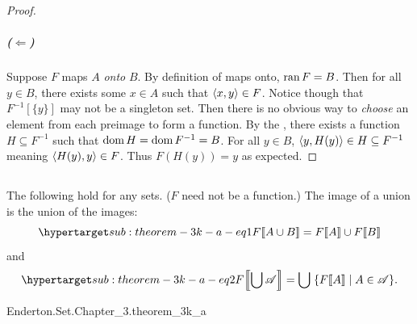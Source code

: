 \documentclass{report}
\begin{document}
\begin{proof}
      \subparagraph{($\Leftarrow$)}%

        Suppose $F$ maps $A$ \textit{onto} $B$.
        By definition of maps onto, $\mathop{\text{ran}}{F} = B$.
        Then for all $y \in B$, there exists some $x \in A$ such that
          $\left< x, y \right> \in F$.
        Notice though that $F^{-1}[\{y\}]$ may not be a singleton set.
        Then there is no obvious way to \textit{choose} an element from each
          preimage to form a function.
        By the , there exists a function
          $H \subseteq F^{-1}$ such that $\mathop{\text{dom}}{H} = \mathop{\text{dom}}{F^{-1}} = B$.
        For all $y \in B$, $\left< y, H(y) \right> \in H \subseteq F^{-1}$
          meaning $\left< H(y), y \right> \in F$.
        Thus $F(H(y)) = y$ as expected.

  \end{proof}

\subsection{}%

  \begin{theorem}[3K(a)]
    The following hold for any sets. ($F$ need not be a function.)
    The image of a union is the union of the images:
      \begin{equation}
        \hyperlabel{sub:theorem-3k-a-eq1}
        \img{F}{A \cup B} = \img{F}{A} \cup \img{F}{B}
      \end{equation}
      and
      \begin{equation}
        \hyperlabel{sub:theorem-3k-a-eq2}
        \img{F}{\bigcup{\mathscr{A}}} =
          \bigcup\;\{\img{F}{A} \mid A \in \mathscr{A}\}.
      \end{equation}
  \end{theorem}

    {Enderton.Set.Chapter\_3.theorem\_3k\_a}
\end{document}
